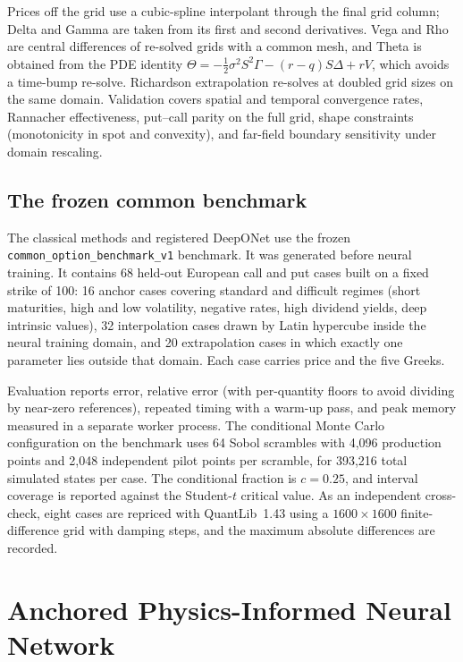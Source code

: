 \documentclass[11pt,a4paper]{article}
\begin{document}
Prices off the grid use a cubic-spline interpolant through the
final grid column; Delta and Gamma are taken from its first and
second derivatives. Vega and Rho are central differences of
re-solved grids with a common mesh, and Theta is obtained from the
PDE identity
\(\Theta=-\tfrac12\sigma^2S^2\Gamma-(r-q)S\Delta+rV\), which avoids
a time-bump re-solve. Richardson extrapolation re-solves at doubled
grid sizes on the same domain. Validation covers spatial and
temporal convergence rates, Rannacher effectiveness, put--call
parity on the full grid, shape constraints (monotonicity in spot
and convexity), and far-field boundary sensitivity under domain
rescaling.

\subsection{The frozen common benchmark}

The classical methods and registered DeepONet use the frozen
\texttt{common\_option\_benchmark\_v1} benchmark. It was generated before neural training. It contains 68 held-out European call and put cases built
on a fixed strike of 100: 16 anchor cases covering standard and
difficult regimes (short maturities, high and low volatility,
negative rates, high dividend yields, deep intrinsic values), 32
interpolation cases drawn by Latin hypercube inside the neural
training domain, and 20 extrapolation cases in which exactly one
parameter lies outside that domain. Each case carries price and the
five Greeks.

Evaluation reports error, relative error (with per-quantity floors
to avoid dividing by near-zero references), repeated timing with a
warm-up pass, and peak memory measured in a separate worker
process. The conditional Monte Carlo configuration on the benchmark
uses 64 Sobol scrambles with 4,096 production points and 2,048 independent
pilot points per scramble, for 393,216 total simulated states per case.
The conditional fraction is \(c=0.25\), and interval coverage is reported
against the Student-\(t\) critical value. As an independent
cross-check, eight cases are repriced with QuantLib~1.43 using a
\(1600\times1600\) finite-difference grid with damping steps, and
the maximum absolute differences are recorded.


\section{Anchored Physics-Informed Neural Network}
\label{sec:pinn}
\end{document}
